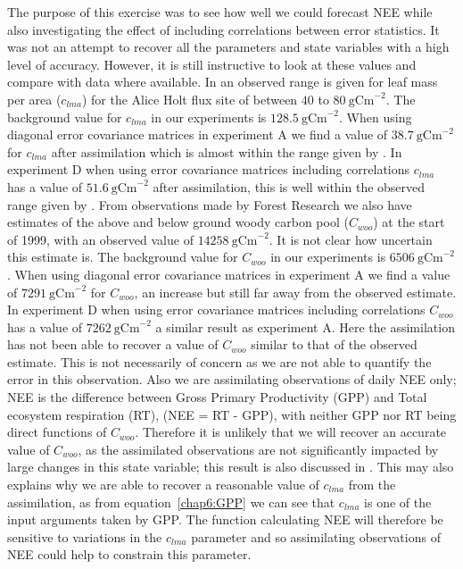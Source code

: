The purpose of this exercise was to see how well we could forecast NEE while also investigating the effect of including correlations between error statistics. It was not an attempt to recover all the parameters and state variables with a high level of accuracy. However, it is still instructive to look at these values and compare with data where available. In \citet{meir2002acclimation} an observed range is given for leaf mass per area ($c_{lma}$) for the Alice Holt flux site of between $40$ to $80 ~\text{gCm}^{-2}$. The background value for $c_{lma}$ in our experiments is $128.5 ~\text{gCm}^{-2}$. When using diagonal error covariance matrices in experiment A we find a value of $38.7~\text{gCm}^{-2}$ for $c_{lma}$ after assimilation which is almost within the range given by \citet{meir2002acclimation}. In experiment D when using error covariance matrices including correlations $c_{lma}$ has a value of $51.6~\text{gCm}^{-2}$ after assimilation, this is well within the observed range given by \citet{meir2002acclimation}. From observations made by Forest Research we also have estimates of the above and below ground woody carbon pool ($C_{woo}$) at the start of 1999, with an observed value of $14258~\text{gCm}^{-2}$. It is not clear how uncertain this estimate is. The background value for $C_{woo}$ in our experiments is $6506~\text{gCm}^{-2}$. When using diagonal error covariance matrices in experiment A we find a value of $7291~\text{gCm}^{-2}$ for $C_{woo}$, an increase but still far away from the observed estimate. In experiment D when using error covariance matrices including correlations $C_{woo}$ has a value of $7262~\text{gCm}^{-2}$ a similar result as experiment A. Here the assimilation has not been able to recover a value of $C_{woo}$ similar to that of the observed estimate. This is not necessarily of concern as we are not able to quantify the error in this observation. Also we are assimilating observations of daily NEE only; NEE is the difference between Gross Primary Productivity (GPP) and Total ecosystem respiration (RT), (NEE = RT - GPP), with neither GPP nor RT being direct functions of $C_{woo}$. Therefore it is unlikely that we will recover an accurate value of $C_{woo}$, as the assimilated observations are not significantly impacted by large changes in this state variable; this result is also discussed in \citet{fox2009reflex}. This may also explains why we are able to recover a reasonable value of $c_{lma}$ from the assimilation, as from equation~\eqref{chap6:GPP} we can see that $c_{lma}$ is one of the input arguments taken by GPP. The function calculating NEE will therefore be sensitive to variations in the $c_{lma}$ parameter and so assimilating observations of NEE could help to constrain this parameter.

